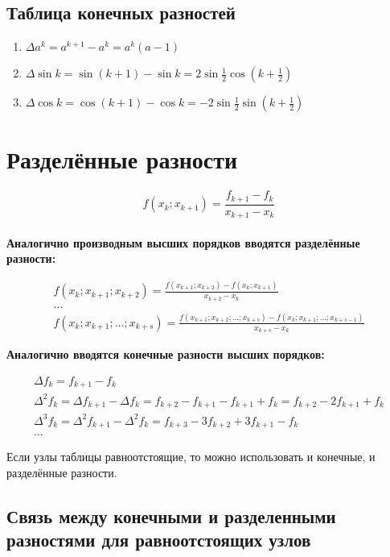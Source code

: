 \documentclass[a4paper,11pt]{article}
\begin{document}
  \subsection{Таблица конечных разностей}
  \begin{enumerate}
    \item \(\Delta a^k = a^{k+1} - a^k = a^k(a-1)\)
    \item \(\Delta \sin{k} = \sin{(k+1)} - \sin{k} = 2\sin{\frac{1}{2}}\cos{(k+\frac{1}{2})} \)
    \item \(\Delta \cos{k} = \cos{(k+1)} - \cos{k} = -2\sin{\frac{1}{2}}\sin{(k+\frac{1}{2})} \)
  \end{enumerate}
\newpage

\section{Разделённые разности}

\[f(x_k; x_{k+1}) = \frac{f_{k+1} - f_k}{x_{k+1} - x_k}\] \\

\textbf{Аналогично производным высших порядков вводятся разделённые разности:}

\begin{gather*}
  f(x_k; x_{k+1}; x_{k+2}) = \frac{f(x_{k+1}; x_{k+2}) - f(x_k; x_{k+1})}{x_{k+2} - x_k} \\
  \dots \\
  f(x_k; x_{k+1}; \dots; x_{k+s}) = \frac{f(x_{k+1}; x_{k+2}; \dots; x_{k+s})
      - f(x_k; x_{k+1}; \dots; x_{k+s-1})}{x_{k+s} - x_k}
\end{gather*}

\textbf{Аналогично вводятся конечные разности высших порядков:}

\begin{gather*}
  \Delta f_k = f_{k+1} - f_k \\
  \Delta^2 f_k = \Delta f_{k+1} - \Delta f_k = f_{k+2} - f_{k+1} - f_{k+1} + f_k = f_{k+2} - 2f_{k+1} + f_k \\
  \Delta^3 f_k = \Delta^2 f_{k+1} - \Delta^2 f_k = f_{k+3} - 3f_{k+2} + 3f_{k+1} - f_k \\
  \dots
\end{gather*}

Если узлы таблицы равноотстоящие, то можно использовать и конечные, и разделённые разности.

  \subsection{Связь между конечными и разделенными разностями для равноотстоящих узлов}
\end{document}
